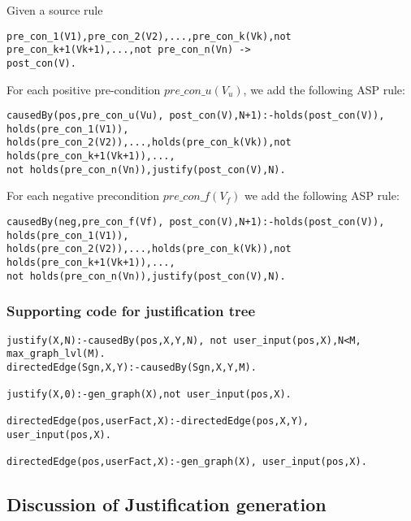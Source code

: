 \documentclass[sigconf]{acmart}
\begin{document}
Given a source rule 
\begin{verbatim}
pre_con_1(V1),pre_con_2(V2),...,pre_con_k(Vk),not pre_con_k+1(Vk+1),...,not pre_con_n(Vn) -> 
post_con(V).
\end{verbatim}

For each positive pre-condition $pre\_con\_u(V_{u})$, we add the following ASP rule:

\begin{verbatim}
causedBy(pos,pre_con_u(Vu), post_con(V),N+1):-holds(post_con(V)), holds(pre_con_1(V1)),
holds(pre_con_2(V2)),...,holds(pre_con_k(Vk)),not holds(pre_con_k+1(Vk+1)),...,
not holds(pre_con_n(Vn)),justify(post_con(V),N).   
\end{verbatim}
For each negative precondition $pre\_con\_f(V_{f})$ we add the following ASP
rule: 
\begin{verbatim}
causedBy(neg,pre_con_f(Vf), post_con(V),N+1):-holds(post_con(V)), holds(pre_con_1(V1)),
holds(pre_con_2(V2)),...,holds(pre_con_k(Vk)),not holds(pre_con_k+1(Vk+1)),...,
not holds(pre_con_n(Vn)),justify(post_con(V),N).   
\end{verbatim}


\subsubsection{Supporting code for justification tree}

\begin{verbatim}
justify(X,N):-causedBy(pos,X,Y,N), not user_input(pos,X),N<M, max_graph_lvl(M).
directedEdge(Sgn,X,Y):-causedBy(Sgn,X,Y,M).

justify(X,0):-gen_graph(X),not user_input(pos,X).

directedEdge(pos,userFact,X):-directedEdge(pos,X,Y), user_input(pos,X).

directedEdge(pos,userFact,X):-gen_graph(X), user_input(pos,X).

\end{verbatim}

\subsection{Discussion of Justification generation}
\end{document}
